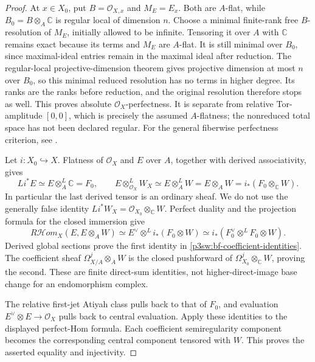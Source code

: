 \documentclass[11pt]{article}
\newcommand{\C}{\mathbb C}
\numberwithin{equation}{section}
\begin{document}
\begin{proof}
At \(x\in X_0\), put \(B=\mathcal O_{X,x}\) and \(M_E=E_x\).
Both are \(A\)-flat, while \(B_0=B\otimes_A\C\) is regular local
of dimension \(n\).  Choose a minimal finite-rank free
\(B\)-resolution of \(M_E\), initially allowed to be infinite.
Tensoring it over \(A\) with \(\C\) remains exact because its
terms and \(M_E\) are \(A\)-flat.  It is still minimal over
\(B_0\), since maximal-ideal entries remain in the maximal ideal
after reduction.  The regular-local projective-dimension theorem
gives projective dimension at most \(n\) over \(B_0\), so this
minimal reduced resolution has no terms in higher degree.  Its
ranks are the ranks before reduction, and the original resolution
therefore stops as well.  This proves absolute
\(\mathcal O_X\)-perfectness.  It is separate from relative
Tor-amplitude \([0,0]\), which is precisely the assumed
\(A\)-flatness; the nonreduced total space has not been declared
regular.
For the general fiberwise perfectness criterion, see
\cite[Proposition~4.5 and Lemma~4.6, p.~169]{P3SWBuchweitzFlenner2003}.

Let \(i:X_0\hookrightarrow X\).  Flatness of \(\mathcal O_X\)
and \(E\) over \(A\), together with derived associativity, gives
\begin{equation}
\label{p3sw:bf-derived-coefficient}
 Li^*E\simeq E\otimes_A^L\C=F_0,\qquad
 E\otimes_{\mathcal O_X}^L W_X
   \simeq E\otimes_A^L W
   =E\otimes_AW=i_*(F_0\otimes_\C W).
\end{equation}
In particular the last derived tensor is an ordinary sheaf.  We
do not use the generally false identity
\(Li^*W_X=\mathcal O_{X_0}\otimes_\C W\).
Perfect duality and the projection formula for the closed
immersion give
\[
 R\mathcal{H}om_X(E,E\otimes_AW)
 \simeq E^\vee\otimes^L i_*(F_0\otimes W)
 \simeq i_*(F_0^\vee\otimes^L F_0\otimes W).
\]
Derived global sections prove the first identity in
\eqref{p3sw:bf-coefficient-identities}.  The coefficient sheaf
\(\Omega^j_{X/A}\otimes_AW\) is the closed pushforward of
\(\Omega_{X_0}^j\otimes_\C W\), proving the second.
These are finite direct-sum identities, not higher-direct-image
base change for an endomorphism complex.

The relative first-jet Atiyah class pulls back to that of \(F_0\),
and evaluation \(E^\vee\otimes E\to\mathcal O_X\) pulls back to
central evaluation.  Apply these identities to the displayed
perfect-Hom formula.  Each coefficient semiregularity component
becomes the corresponding central component tensored with \(W\).
This proves the asserted equality and injectivity.
\end{proof}
\end{document}
